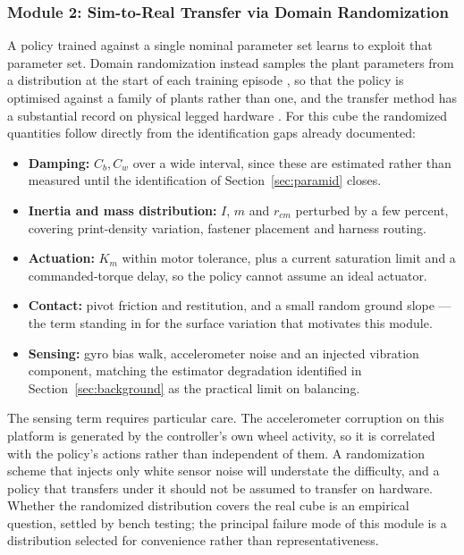 \subsubsection{Module 2: Sim-to-Real Transfer via Domain Randomization}

A policy trained against a single nominal parameter set learns to exploit that
parameter set. Domain randomization instead samples the plant parameters from
a distribution at the start of each training episode
\cite{tobin2017domainrand}, so that the policy is optimised against a family
of plants rather than one, and the transfer method has a substantial record on
physical legged hardware \cite{hwangbo2019anymal}. For this cube the
randomized quantities follow directly from the identification gaps already
documented:

\begin{itemize}
    \item \textbf{Damping:} $C_b, C_w$ over a wide interval, since these are
    estimated rather than measured until the identification of
    Section~\ref{sec:paramid} closes.
    \item \textbf{Inertia and mass distribution:} $I$, $m$ and $r_{cm}$
    perturbed by a few percent, covering print-density variation, fastener
    placement and harness routing.
    \item \textbf{Actuation:} $K_m$ within motor tolerance, plus a current
    saturation limit and a commanded-torque delay, so the policy cannot assume
    an ideal actuator.
    \item \textbf{Contact:} pivot friction and restitution, and a small random
    ground slope --- the term standing in for the surface variation that
    motivates this module.
    \item \textbf{Sensing:} gyro bias walk, accelerometer noise and an
    injected vibration component, matching the estimator degradation
    identified in Section~\ref{sec:background} as the practical limit on
    balancing.
\end{itemize}

The sensing term requires particular care. The accelerometer corruption on this
platform is generated by the controller's own wheel activity, so it is
correlated with the policy's actions rather than independent of them. A
randomization scheme that injects only white sensor noise will understate the
difficulty, and a policy that transfers under it should not be assumed to
transfer on hardware. Whether the randomized distribution covers the real cube
is an empirical question, settled by bench testing; the principal failure mode
of this module is a distribution selected for convenience rather than
representativeness.

